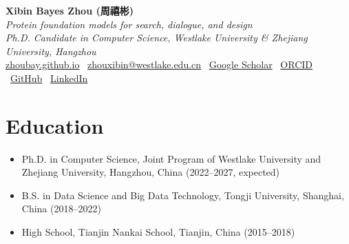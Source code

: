 \documentclass[10pt]{article}
\begin{document}
\begin{center}
{\Large \textbf{Xibin Bayes Zhou (周禧彬)}}\\[0.15cm]
\textit{Protein foundation models for search, dialogue, and design}\\[0.1cm]
\textit{Ph.D. Candidate in Computer Science, Westlake University \& Zhejiang University, Hangzhou}\\[0.1cm]
\href{https://zhoubay.github.io}{zhoubay.github.io} \textbar\
\href{mailto:zhouxibin@westlake.edu.cn}{zhouxibin@westlake.edu.cn} \textbar\
\href{https://scholar.google.com/citations?user=ey4rxTIAAAAJ}{Google Scholar} \textbar\
\href{https://orcid.org/0009-0007-8879-4966}{ORCID} \textbar\
\href{https://github.com/zhoubay}{GitHub} \textbar\
\href{https://www.linkedin.com/in/xibinbayeszhou/}{LinkedIn}
\end{center}

\section*{Education}
\begin{itemize}
    \item Ph.D. in Computer Science, Joint Program of Westlake University and Zhejiang University, Hangzhou, China (2022--2027, expected)
    \item B.S. in Data Science and Big Data Technology, Tongji University, Shanghai, China (2018--2022)
    \item High School, Tianjin Nankai School, Tianjin, China (2015--2018)
\end{itemize}
\end{document}

